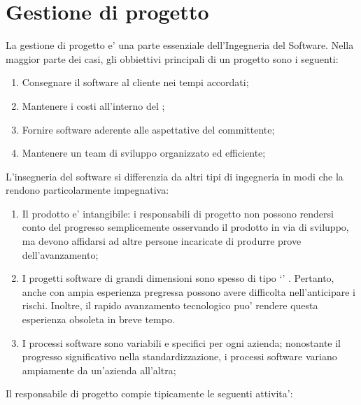 \section{Gestione di progetto}

La gestione di progetto e' una parte essenziale dell'Ingegneria del Software.
Nella maggior parte dei casi, gli obbiettivi principali di un progetto sono i
seguenti:

\begin{enumerate}
  \item Consegnare il software al cliente nei tempi accordati;
  \item Mantenere i costi all'interno del ;
  \item Fornire software aderente alle aspettative del committente;
  \item Mantenere un team di sviluppo organizzato ed efficiente;
\end{enumerate}

L'insegneria del software si differenzia da altri tipi di ingegneria in modi che
la rendono particolarmente impegnativa:

\begin{enumerate}
  \item Il prodotto e' intangibile: i responsabili di progetto non possono
    rendersi conto del progresso semplicemente osservando il prodotto in via di
    sviluppo, ma devono affidarsi ad altre persone incaricate di produrre prove
    dell'avanzamento;
  \item I progetti software di grandi dimensioni sono spesso di tipo
    `' . Pertanto, anche
     con ampia esperienza pregressa possono avere
    difficolta nell'anticipare i rischi. Inoltre, il rapido avanzamento
    tecnologico puo' rendere questa esperienza obsoleta in breve tempo.
  \item I processi software sono variabili e specifici per ogni azienda;
    nonostante il progresso significativo nella standardizzazione, i processi
    software variano ampiamente da un'azienda all'altra;
\end{enumerate}


Il responsabile di progetto compie tipicamente le seguenti attivita':

